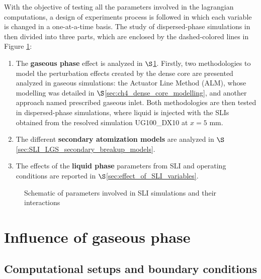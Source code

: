 With the objective of testing all the parameters involved in the lagrangian computations, a design of experiments process is followed in which each variable is changed in a one-at-a-time basis. The study of dispersed-phase simulations in then divided into three parts, which are enclosed by the dashed-colored lines in Figure  \ref{fig:dispersed_phase_sli_parameters}:

\begin{enumerate}

	\item The \textbf{gaseous phase} effect is analyzed in $\S$\ref{sec:SLI_LGS_gaseous_phase_effect}. Firstly, two methodologies to model the perturbation effects created by the dense core are presented analyzed in gaseous simulations: the Actuator Line Method (ALM), whose modelling was detailed in $\S$\ref{sec:ch4_dense_core_modelling}, and another approach named prescribed gaseous inlet. Both methodologies are then tested in dispersed-phase simulations, where liquid is injected with the SLIs obtained from the resolved simulation UG100\_DX10 at $x = 5$ mm.
	
	\item The different \textbf{secondary atomization models} are analyzed in $\S$\ref{sec:SLI_LGS_secondary_breakup_models}. 
	
	\item The effects of the \textbf{liquid phase} parameters from SLI and operating conditions are reported in $\S$\ref{sec:effect_of_SLI_variables}. 

\end{enumerate}


\begin{figure}[ht]	
	\centering	{}
	\caption{Schematic of parameters involved in SLI simulations and their interactions}	\label{fig:dispersed_phase_sli_parameters}
\end{figure}



\section{Influence of gaseous phase}
\label{sec:SLI_LGS_gaseous_phase_effect}


\subsection{Computational setups and boundary conditions}
\label{sec:ch6_BC_gaseous_phase}

